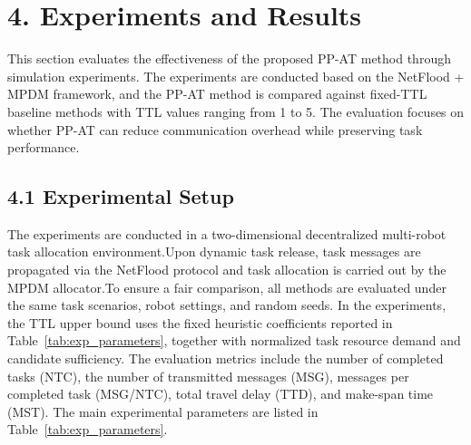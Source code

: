 \documentclass[type=submission,name=IR]{oae}
\begin{document}
\section{4. Experiments and Results}
This section evaluates the effectiveness of the proposed PP-AT method through simulation experiments. The experiments are conducted based on the NetFlood + MPDM framework, and the PP-AT method is compared against fixed-TTL baseline methods with TTL values ranging from 1 to 5. The evaluation focuses on whether PP-AT can reduce communication overhead while preserving task performance.
\subsection{4.1 Experimental Setup}
The experiments are conducted in a two-dimensional decentralized multi-robot task allocation environment.Upon dynamic task release, task messages are propagated via the NetFlood protocol and task allocation is carried out by the MPDM allocator.To ensure a fair comparison, all methods are evaluated under the same task scenarios, robot settings, and random seeds. In the experiments, the TTL upper bound uses the fixed heuristic coefficients reported in Table~\ref{tab:exp_parameters}, together with normalized task resource demand and candidate sufficiency. The evaluation metrics include the number of completed tasks (NTC), the number of transmitted messages (MSG), messages per completed task (MSG/NTC), total travel delay (TTD), and make-span time (MST). The main experimental parameters are listed in Table~\ref{tab:exp_parameters}.
\end{document}
